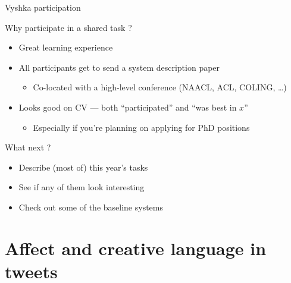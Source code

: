 \documentclass[10pt, compress]{beamer}
\begin{document}
\begin{frame}{Vyshka participation}

Why participate in a shared task ? 

\begin{itemize}
  \item Great learning experience
  \item All participants get to send a system description paper 
  \begin{itemize}
    \item Co-located with a high-level conference (NAACL, ACL, COLING, \ldots)
  \end{itemize}
  \item Looks good on CV --- both ``participated'' and ``was best in $x$''
  \begin{itemize}
    \item Especially if you're planning on applying for PhD positions
  \end{itemize}
\end{itemize}

What next ? 
\begin{itemize}
  \item Describe (most of) this year's tasks 
  \item See if any of them look interesting
  \item Check out some of the baseline systems 
\end{itemize}

\end{frame}

\section{Affect and creative language in tweets}
\end{document}
